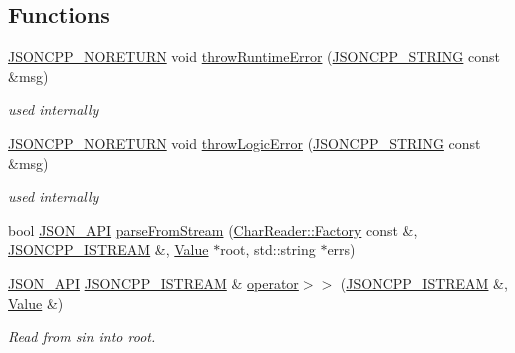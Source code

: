 \subsection*{Functions}
\begin{DoxyCompactItemize}
\item 
\hyperlink{json_8h_a78c5ba441d8b48f24a5095b97f01f282}{J\+S\+O\+N\+C\+P\+P\+\_\+\+N\+O\+R\+E\+T\+U\+RN} void \hyperlink{namespace_json_a0ab7ff7f99788262d92d9ff3d924e065}{throw\+Runtime\+Error} (\hyperlink{json_8h_a1e723f95759de062585bc4a8fd3fa4be}{J\+S\+O\+N\+C\+P\+P\+\_\+\+S\+T\+R\+I\+NG} const \&msg)
\begin{DoxyCompactList}\small\item\em used internally \end{DoxyCompactList}\item 
\hyperlink{json_8h_a78c5ba441d8b48f24a5095b97f01f282}{J\+S\+O\+N\+C\+P\+P\+\_\+\+N\+O\+R\+E\+T\+U\+RN} void \hyperlink{namespace_json_a27790f21f17922fac81e7cd72a5659a5}{throw\+Logic\+Error} (\hyperlink{json_8h_a1e723f95759de062585bc4a8fd3fa4be}{J\+S\+O\+N\+C\+P\+P\+\_\+\+S\+T\+R\+I\+NG} const \&msg)
\begin{DoxyCompactList}\small\item\em used internally \end{DoxyCompactList}\item 
bool \hyperlink{json_8h_a1d61ffde86ce1a18fd83194ff0d9a206}{J\+S\+O\+N\+\_\+\+A\+PI} \hyperlink{namespace_json_aab0cf1ecf81d1aeca12be2a416a84352}{parse\+From\+Stream} (\hyperlink{class_json_1_1_char_reader_1_1_factory}{Char\+Reader\+::\+Factory} const \&, \hyperlink{json_8h_a15f2f70b2ce0a2abd0f8112393dbc4de}{J\+S\+O\+N\+C\+P\+P\+\_\+\+I\+S\+T\+R\+E\+AM} \&, \hyperlink{class_json_1_1_value}{Value} $\ast$root, std\+::string $\ast$errs)
\item 
\hyperlink{json_8h_a1d61ffde86ce1a18fd83194ff0d9a206}{J\+S\+O\+N\+\_\+\+A\+PI} \hyperlink{json_8h_a15f2f70b2ce0a2abd0f8112393dbc4de}{J\+S\+O\+N\+C\+P\+P\+\_\+\+I\+S\+T\+R\+E\+AM} \& \hyperlink{namespace_json_a244ed0996aba750c40c1641c06bba449}{operator$>$$>$} (\hyperlink{json_8h_a15f2f70b2ce0a2abd0f8112393dbc4de}{J\+S\+O\+N\+C\+P\+P\+\_\+\+I\+S\+T\+R\+E\+AM} \&, \hyperlink{class_json_1_1_value}{Value} \&)
\begin{DoxyCompactList}\small\item\em Read from \textquotesingle{}sin\textquotesingle{} into \textquotesingle{}root\textquotesingle{}. \end{DoxyCompactList}\item 

\end{DoxyCompactItemize}
